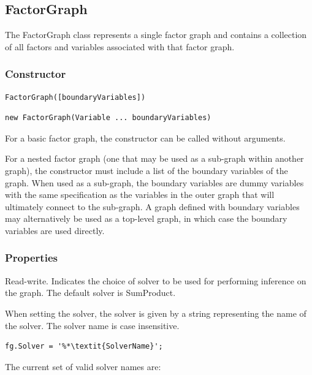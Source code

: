 \subsection{FactorGraph}

The FactorGraph class represents a single factor graph and contains a collection of all factors and variables associated with that factor graph.

\subsubsection{Constructor}

\ifmatlab
\begin{lstlisting}
FactorGraph([boundaryVariables])
\end{lstlisting}
\fi

\ifjava
\begin{lstlisting}
new FactorGraph(Variable ... boundaryVariables)
\end{lstlisting}
\fi

For a basic factor graph, the constructor can be called without arguments.

For a nested factor graph (one that may be used as a sub-graph within another graph), the constructor must include a list of the boundary variables of the graph.  When used as a sub-graph, the boundary variables are dummy variables with the same specification as the variables in the outer graph that will ultimately connect to the sub-graph.  A graph defined with boundary variables may alternatively be used as a top-level graph, in which case the boundary variables are used directly.

\subsubsection{Properties}

\label{sec:FactorGraph.Solver}

Read-write.  Indicates the choice of solver to be used for performing inference on the graph.  The default solver is SumProduct.

\ifmatlab
When setting the solver, the solver is given by a string representing the name of the solver.  The solver name is case insensitive.

\begin{lstlisting}
fg.Solver = '%*\textit{SolverName}';
\end{lstlisting}

The current set of valid solver names are:

